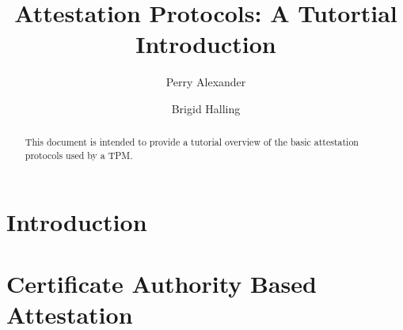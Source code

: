\documentclass[10pt]{article}
\title{Attestation Protocols: A Tutortial Introduction}
\author{Perry Alexander \and Brigid Halling}
\begin{document}
\maketitle
\tableofcontents
\listoffigures
\listoftables

\begin{abstract}
  This document is intended to provide a tutorial overview of the
  basic attestation protocols used by a TPM.
\end{abstract}

\section{Introduction}

\section{Certificate Authority Based Attestation}
\end{document}
